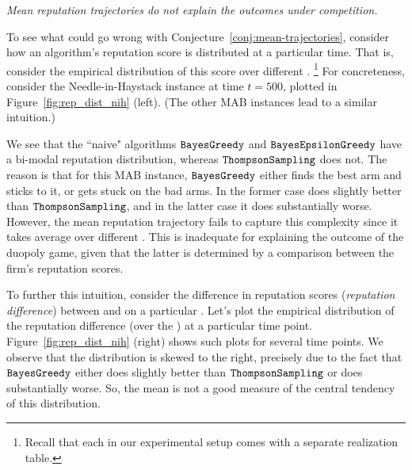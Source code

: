 \documentclass[../competing_bandits_with_appendix.tex]{subfiles}
\begin{document}
\begin{finding}
\textit{
Mean reputation trajectories do not explain the outcomes under competition.}
\end{finding}

To see what could go wrong with Conjecture~\ref{conj:mean-trajectories}, consider how an algorithm's reputation score is distributed at a particular time. That is, consider the empirical distribution of this score over different \MRVs.%
\footnote{Recall that each \MRV in our experimental setup comes with a separate realization table.} For concreteness, consider the Needle-in-Haystack instance at time $t=500$, plotted in Figure~\ref{fig:rep_dist_nih} (left). (The other MAB instances lead to a similar intuition.)

We see that the ``naive" algorithms $\mathtt{BayesGreedy}$ and $\mathtt{BayesEpsilonGreedy}$ have a bi-modal reputation distribution, whereas $\mathtt{ThompsonSampling}$ does not. The reason is that for this MAB instance, $\mathtt{BayesGreedy}$ either finds the best arm and sticks to it, or gets stuck on the bad arms. In the former case \DynamicGreedy does slightly better than $\mathtt{ThompsonSampling}$, and in the latter case it does substantially worse. However, the mean reputation trajectory fails to capture this complexity since it takes average over different \MRVs. This is inadequate for explaining the outcome of the duopoly game, given that the latter is determined by a comparison between the firm's reputation scores.

To further this intuition, consider the difference in reputation scores (\emph{reputation difference}) between \Thompson and \DynamicGreedy on a particular \MRV. Let's plot the empirical distribution of the reputation difference (over the \MRVs) at a particular time point. Figure~\ref{fig:rep_dist_nih} (right) shows such plots for several time points. We observe that the distribution is skewed to the right, precisely due to the fact that $\mathtt{BayesGreedy}$ either does slightly better than $\mathtt{ThompsonSampling}$ or does substantially worse. So, the mean is not a good measure of the central tendency of this distribution.

\end{document}
